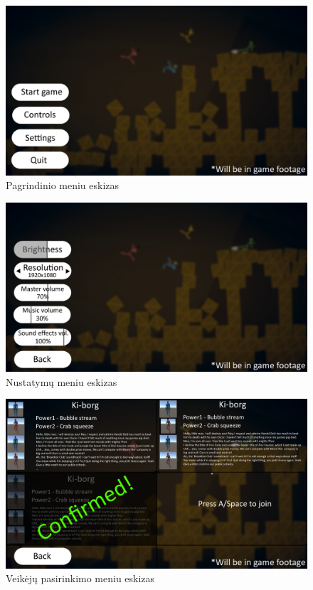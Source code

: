 \documentclass{VUMIFPSkursinis}
\begin{document}
\begin{figure}[H]
    \centering
    \includegraphics[scale=0.3]{img/Menus/Main.png}
    \caption{Pagrindinio meniu eskizas}
    \label{img:Main_menu}
\end{figure}

\begin{figure}[H]
    \centering
    \includegraphics[scale=0.3]{img/Menus/Settings.png}
    \caption{Nustatymų meniu eskizas}
    \label{img:Settings_menu}
\end{figure}

\begin{figure}[H]
    \centering
    \includegraphics[scale=0.3]{img/Menus/Character_choice.png}
    \caption{Veikėjų pasirinkimo meniu eskizas}
    \label{img:Character_choice_menu}
\end{figure}
\end{document}
